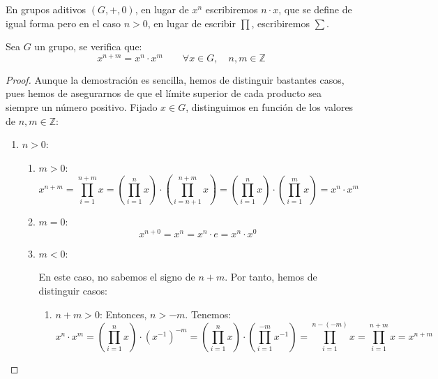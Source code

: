 \begin{notacion}
    En grupos aditivos $(G,+,0)$, en lugar de $x^n$ escribiremos $n\cdot x$, que se define de igual forma pero en el caso $n>0$, en lugar de escribir $\prod$, escribiremos $\sum$.
\end{notacion}

\begin{prop}
    Sea $G$ un grupo, se verifica que:
    \begin{equation*}
        x^{n+m} = x^n \cdot x^m \qquad \forall x\in G, \quad n,m\in \mathbb{Z}
    \end{equation*}
    \begin{proof} %
 Aunque la demostración es sencilla, hemos de distinguir bastantes casos, pues hemos de asegurarnos de que el límite superior de cada producto sea siempre un número positivo.
    Fijado $x\in G$, distinguimos en función de los valores de $n,m\in \mathbb{Z}$:
    \begin{enumerate}
        \item \ul{$n>0$}:
        \begin{enumerate}
            \item \ul{$m>0$}:
            \begin{equation*}
                x^{n+m} = \prod_{i=1}^{n+m} x =\left(\prod_{i=1}^n x\right) \cdot\left(\prod_{i=n+1}^{n+m} x\right)
                =\left(\prod_{i=1}^n x\right) \cdot\left(\prod_{i=1}^m x\right) = x^n \cdot x^m
            \end{equation*}

            \item \ul{$m=0$}:
            \begin{equation*}
                x^{n+0} = x^n = x^n \cdot e = x^n \cdot x^0
            \end{equation*}

            \item \ul{$m<0$}:
            
            En este caso, no sabemos el signo de $n+m$. Por tanto, hemos de distinguir casos:
            \begin{enumerate}
                \item \ul{$n+m>0$}:
                Entonces, $n>-m$. Tenemos:
                \begin{equation*}
                    x^n \cdot x^m =\left(\prod_{i=1}^n x\right) \cdot \left(x^{-1}\right)^{-m}
                    =\left(\prod_{i=1}^n x\right) \cdot\left(\prod_{i=1}^{-m} x^{-1}\right) =\prod_{i=1}^{n-(-m)} x
                    =\prod_{i=1}^{n+m} x = x^{n+m}
                \end{equation*}


\end{enumerate}
\end{enumerate}
\end{enumerate}
\end{proof}
\end{prop}
